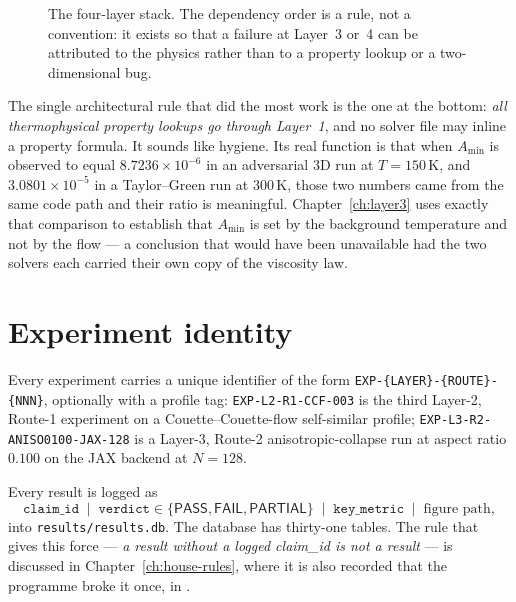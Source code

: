 \begin{figure}[ht]
\caption[The layer stack]{The four-layer stack. The dependency order is a
rule, not a convention: it exists so that a failure at Layer~3 or~4 can be
attributed to the physics rather than to a property lookup or a
two-dimensional bug.}
\label{fig:layer-stack}
\end{figure}

The single architectural rule that did the most work is the one at the bottom:
\emph{all thermophysical property lookups go through Layer~1}, and no solver
file may inline a property formula. It sounds like hygiene. Its real function
is that when \(A_{\min}\) is observed to equal \(8.7236\times10^{-6}\) in an
adversarial 3D run at \(T=150\,\mathrm{K}\), and \(3.0801\times10^{-5}\) in a
Taylor--Green run at \(300\,\mathrm{K}\), those two numbers came from the same
code path and their ratio is meaningful. Chapter~\ref{ch:layer3} uses exactly
that comparison to establish that \(A_{\min}\) is set by the background
temperature and not by the flow --- a conclusion that would have been
unavailable had the two solvers each carried their own copy of the viscosity
law.

\section{Experiment identity}
\label{sec:exp-ids}

Every experiment carries a unique identifier of the form
\texttt{EXP-\{LAYER\}-\{ROUTE\}-\{NNN\}}, optionally with a profile tag:
\texttt{EXP-L2-R1-CCF-003} is the third Layer-2, Route-1 experiment on a
Couette--Couette-flow self-similar profile;
\texttt{EXP-L3-R2-ANISO0100-JAX-128} is a Layer-3, Route-2 anisotropic-collapse
run at aspect ratio \(0.100\) on the JAX backend at \(N=128\).

Every result is logged as
\[
  \texttt{claim\_id} \;\mid\;
  \texttt{verdict}\in\{\textsf{PASS},\textsf{FAIL},\textsf{PARTIAL}\}
  \;\mid\; \texttt{key\_metric} \;\mid\; \text{figure path},
\]
into \texttt{results/results.db}. The database has thirty-one tables. The rule
that gives this force --- \emph{a result without a logged claim\_id is not a
result} --- is discussed in Chapter~\ref{ch:house-rules}, where it is also
recorded that the programme broke it once, in .

